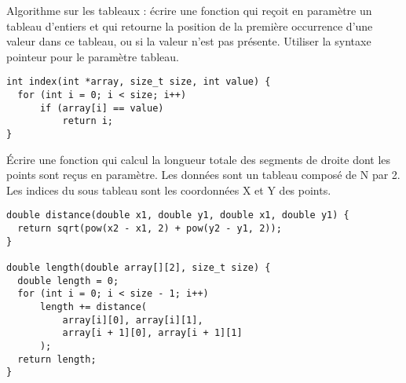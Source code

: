\documentclass[french,a4paper,addpoints,11pt]{exam}
\begin{document}
\begin{questions}
\question Algorithme sur les tableaux : écrire une fonction qui reçoit en paramètre un tableau d'entiers et qui retourne la position de la première occurrence d'une valeur dans ce tableau, ou  si la valeur n'est pas présente. Utiliser la syntaxe pointeur pour le paramètre tableau.

\ifprintanswers
\begin{solution}
\begin{lstlisting}
int index(int *array, size_t size, int value) {
  for (int i = 0; i < size; i++)
      if (array[i] == value)
          return i;
}
\end{lstlisting}
\end{solution}
\else
\fillwithdottedlines{5cm}
\fi

\question
Écrire une fonction qui calcul la longueur totale des segments de droite dont les points sont reçus en paramètre. Les données sont un tableau composé de N par 2. Les indices du sous tableau sont les coordonnées X et Y des points.

\ifprintanswers
\begin{solution}
\begin{lstlisting}
double distance(double x1, double y1, double x1, double y1) {
  return sqrt(pow(x2 - x1, 2) + pow(y2 - y1, 2));
}

double length(double array[][2], size_t size) {
  double length = 0;
  for (int i = 0; i < size - 1; i++)
      length += distance(
          array[i][0], array[i][1],
          array[i + 1][0], array[i + 1][1]
      );
  return length;
}
\end{lstlisting}
\end{solution}
\else
\fillwithdottedlines{7cm}
\fi

\end{questions}
\end{document}

